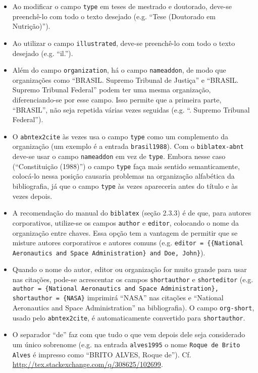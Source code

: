 \documentclass[a4paper]{article}
\begin{document}
\begin{itemize}
    \item Ao modificar o campo \verb`type` em teses de mestrado e doutorado, deve-se preenchê-lo com todo o texto desejado (e.g. ``Tese (Doutorado em Nutrição)'').
    \item Ao utilizar o campo \verb`illustrated`, deve-se preenchê-lo com todo o texto desejado (e.g. ``il.'').
    \item Além do campo \verb`organization`, há o campo \verb`nameaddon`, de modo que organizações como ``BRASIL. Supremo Tribunal de Justiça'' e ``BRASIL. Supremo Tribunal Federal'' podem ter uma mesma organização, diferenciando-se por esse campo. Isso permite que a primeira parte, ``BRASIL'', não seja repetida várias vezes seguidas (e.g. ``\underline{\hspace*{4em}}. Supremo Tribunal Federal'').
    \item O \verb`abntex2cite` às vezes usa o campo \verb`type` como um complemento da organização (um exemplo é a entrada \verb`brasil1988`). Com o \verb`biblatex-abnt` deve-se usar o campo \verb`nameaddon` em vez de \verb`type`. Embora nesse caso (``Constituição (1988)'') o campo \verb`type` faça mais sentido semanticamente, colocá-lo nessa posição causaria problemas na organização alfabética da bibliografia, já que o campo \verb`type` às vezes apareceria antes do título e às vezes depois.
    \item A recomendação do manual do \verb`biblatex` (seção 2.3.3) é de que, para autores corporativos, utilize-se os campos \verb`author` e \verb`editor`, colocando o nome da organização entre chaves. Essa opção tem a vantagem de permitir que se misture autores corporativos e autores comuns (e.g. \verb`editor = {{National` \verb`Aeronautics and Space Administration} and Doe, John}`).
    \item Quando o nome do autor, editor ou organização for muito grande para usar nas citações, pode-se acrescentar os campos \verb`shortauthor` e \verb`shorteditor` (e.g. \verb`author = {National Aeronautics and Space Administration},` \verb`shortauthor = {NASA}` imprimirá ``NASA'' nas citações e ``National Aeronautics and Space Administration'' na bibliografia). O campo \verb`org-short`, usado pelo \verb`abntex2cite`, é automaticamente convertido para \verb`shortauthor`.
    \item O separador ``de'' faz com que tudo o que vem depois dele seja considerado um único sobrenome (e.g. na entrada \verb`alves1995` o nome \verb`Roque de Brito` \verb`Alves` é impresso como ``BRITO ALVES, Roque de''). Cf. \url{http://tex.stackexchange.com/q/308625/102699}.

\end{itemize}
\end{document}
